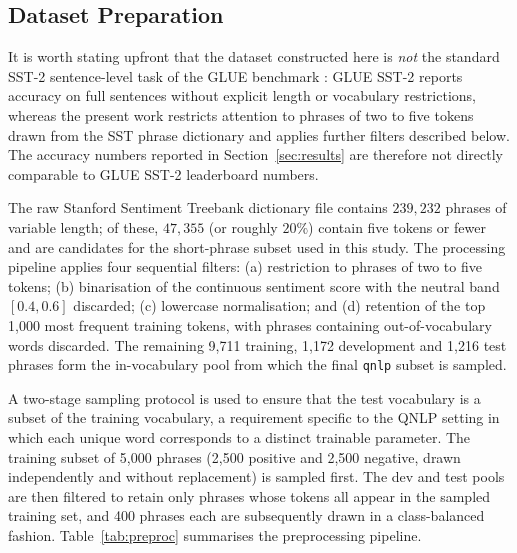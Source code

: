 \documentclass[11pt, a4paper]{article}
\begin{document}
\subsection{Dataset Preparation}
\label{sec:data}

It is worth stating upfront that the dataset constructed here is
\emph{not} the standard SST-2 sentence-level task of the GLUE
benchmark \citep{wang2018glue}: GLUE SST-2 reports accuracy on full
sentences without explicit length or vocabulary restrictions, whereas
the present work restricts attention to phrases of two to five
tokens drawn from the SST phrase dictionary and applies further
filters described below. The accuracy numbers reported in
Section~\ref{sec:results} are therefore not directly comparable to
GLUE SST-2 leaderboard numbers.

The raw Stanford Sentiment Treebank dictionary file contains
\(239{,}232\) phrases of variable length; of these, \(47{,}355\)
(or roughly \(20\%\)) contain five tokens or fewer and are
candidates for the short-phrase subset used in this study. The
processing pipeline applies four sequential filters: (a) restriction
to phrases of two to five tokens; (b) binarisation of the continuous
sentiment score with the neutral band \([0.4, 0.6]\) discarded;
(c) lowercase normalisation; and (d) retention of the top
1{,}000 most frequent training tokens, with phrases containing
out-of-vocabulary words discarded. The remaining 9{,}711 training,
1{,}172 development and 1{,}216 test phrases form the in-vocabulary
pool from which the final \texttt{qnlp} subset is sampled.

A two-stage sampling protocol is used to ensure that the test
vocabulary is a subset of the training vocabulary, a requirement
specific to the QNLP setting in which each unique word corresponds to
a distinct trainable parameter. The training subset of 5{,}000 phrases
(2{,}500 positive and 2{,}500 negative, drawn independently and
without replacement) is sampled first. The dev and test pools are then
filtered to retain only phrases whose tokens all appear in the sampled
training set, and 400 phrases each are subsequently drawn in a
class-balanced fashion. Table~\ref{tab:preproc} summarises the
preprocessing pipeline.
\end{document}
